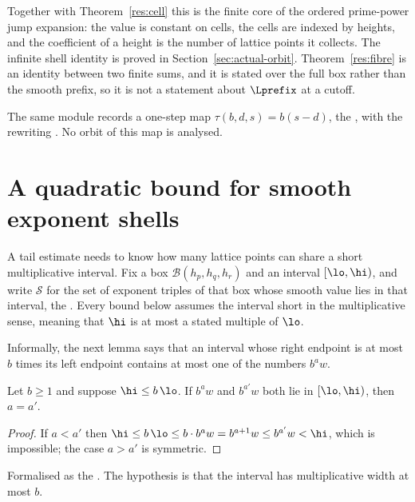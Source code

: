 Together with Theorem~\ref{res:cell} this is the finite core of the ordered
prime-power jump expansion: the value is constant on cells, the cells are
indexed by heights, and the coefficient of a height is the number of lattice
points it collects.  The infinite shell identity is proved in Section~\ref{sec:actual-orbit}.  Theorem~\ref{res:fibre} is an identity between two finite sums,
and it is stated over the full box rather than the smooth prefix, so it is not
a statement about $\Lprefix$ at a cutoff.

The same module records a one-step map $\tau(b,d,s)=b(s-d)$, the
, with the rewriting
.  No orbit of this map is analysed.


\section{A quadratic bound for smooth exponent shells}\label{sec:shell}

A tail estimate needs to know how many lattice points can share a short
multiplicative interval.  Fix a box $\mathcal B(h_p,h_q,h_r)$ and an interval
$[\lo,\hi)$, and write $\mathcal S$ for the set of exponent triples of that box
whose smooth value lies in that interval, the
.  Every bound below assumes the interval short in the
multiplicative sense, meaning that $\hi$ is at most a stated multiple of $\lo$.

Informally, the next lemma says that an interval whose right endpoint is at
most $b$ times its left endpoint contains at most one of the numbers $b^{a}w$.

\begin{lemma}\label{res:short}
Let $b\ge1$ and suppose $\hi\le b\,\lo$.  If $b^{a}w$ and $b^{a'}w$ both lie in
$[\lo,\hi)$, then $a=a'$.
\end{lemma}

\begin{proof}
If $a<a'$ then $\hi\le b\,\lo\le b\cdot b^{a}w=b^{a+1}w\le b^{a'}w<\hi$, which
is impossible; the case $a>a'$ is symmetric.
\end{proof}

\noindent Formalised as the
.  The hypothesis is that the interval has multiplicative width at
most $b$.

